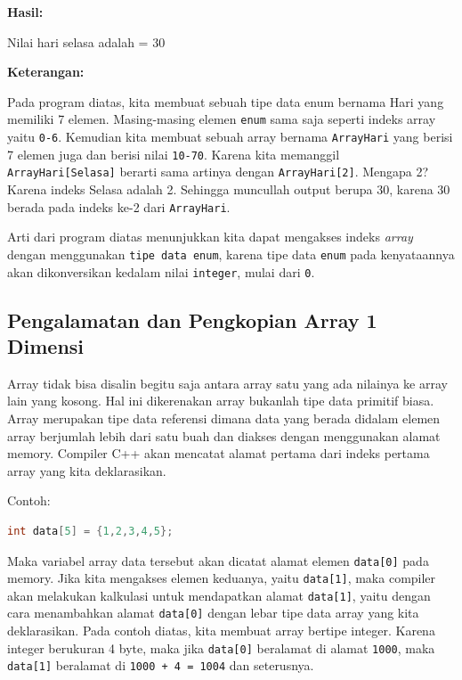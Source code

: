 \textbf{Hasil:}

\begin{lcverbatim}
Nilai hari selasa adalah = 30
\end{lcverbatim}

\textbf{Keterangan:}

Pada program diatas, kita membuat sebuah tipe data enum bernama Hari
yang memiliki 7 elemen. Masing-masing elemen \texttt{enum} sama saja
seperti indeks array yaitu \texttt{0-6}. Kemudian kita membuat sebuah
array bernama \texttt{ArrayHari} yang berisi 7 elemen juga dan berisi
nilai \texttt{10-70}. Karena kita memanggil \\
\texttt{ArrayHari{[}Selasa{]}} berarti sama artinya dengan
\texttt{ArrayHari{[}2{]}}. Mengapa 2? Karena indeks Selasa adalah 2.
Sehingga muncullah output berupa 30, karena 30 berada pada indeks ke-2
dari \texttt{ArrayHari}.

Arti dari program diatas menunjukkan kita dapat mengakses indeks
\emph{array} dengan menggunakan \texttt{tipe\ data\ enum}, karena tipe
data \texttt{enum} pada kenyataannya akan dikonversikan kedalam nilai
\texttt{integer}, mulai dari \texttt{0}.

\subsection{Pengalamatan dan Pengkopian Array 1 Dimensi}\label{pengalamatan-dan-pengkopian-array-1-dimensi}

Array tidak bisa disalin begitu saja antara array satu yang ada nilainya
ke array lain yang kosong. Hal ini dikerenakan array bukanlah tipe data
primitif biasa. Array merupakan tipe data referensi dimana data yang
berada didalam elemen array berjumlah lebih dari satu buah dan diakses
dengan menggunakan alamat memory. Compiler C++ akan mencatat alamat
pertama dari indeks pertama array yang kita deklarasikan.

Contoh:

\begin{lstlisting}[language=c++, numbers=none]
int data[5] = {1,2,3,4,5};
\end{lstlisting}

Maka variabel array data tersebut akan dicatat alamat elemen
\texttt{data{[}0{]}} pada memory. Jika kita mengakses elemen keduanya,
yaitu \texttt{data{[}1{]}}, maka compiler akan melakukan kalkulasi untuk
mendapatkan alamat \texttt{data{[}1{]}}, yaitu dengan cara menambahkan
alamat \texttt{data{[}0{]}} dengan lebar tipe data array yang kita
deklarasikan. Pada contoh diatas, kita membuat array bertipe integer.
Karena integer berukuran 4 byte, maka jika \texttt{data{[}0{]}}
beralamat di alamat \texttt{1000}, maka \texttt{data{[}1{]}} beralamat
di \texttt{1000\ +\ 4\ =\ 1004} dan seterusnya.

